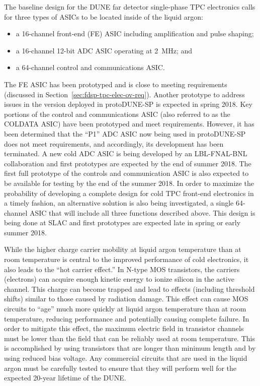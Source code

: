 The baseline design for the DUNE far detector single-phase TPC electronics calls for three types of ASICs to be located inside of the liquid argon:
\begin{itemize}
\item{a 16-channel front-end (FE) ASIC including amplification and pulse shaping;}
\item{a 16-channel 12-bit ADC ASIC operating at 2~MHz; and}
\item{a 64-channel control and communications ASIC.}
\end{itemize}
The FE ASIC has been prototyped and is close to meeting requirements (discussed in Section~\ref{sec:fdsp-tpc-elec-ov-req}). Another prototype to address issues in the version deployed in protoDUNE-SP is expected in spring 2018. Key portions of the control and communications ASIC (also referred to as the COLDATA ASIC) have been prototyped and meet requirements.  However, it has been determined that the ``P1'' ADC ASIC now being used in protoDUNE-SP does not meet requirements, and accordingly, its development has been terminated.  A new cold ADC ASIC is being developed by an LBL-FNAL-BNL collaboration and first prototypes are expected by the end of summer 2018.  The first full prototype of the controls and communication ASIC is also expected to be available for testing by the end of the summer 2018.  In order to maximize the probability of developing a complete design for cold TPC front-end electronics in a timely fashion, an alternative solution is also being investigated, a single 64-channel ASIC that will include all three functions described above.  This design is being done at SLAC and first prototypes are expected late in spring or early summer 2018.

While the higher charge carrier mobility at liquid argon temperature than at room temperature is central to the improved performance of cold electronics, it also leads to the ``hot carrier effect.''  In N-type MOS transistors, the carriers (electrons) can acquire enough kinetic energy to ionize silicon in the active channel.  This charge can become trapped and lead to effects (including threshold shifts) similar to those caused by radiation damage.  This effect can cause MOS circuits to ``age'' much more quickly at liquid argon temperature than at room temperature, reducing performance and potentially causing complete failure.  In order to mitigate this effect, the maximum electric field in transistor channels must be lower than the field that can be reliably used at room temperature.  This is accomplished by using transistors that are longer than minimum length and by using reduced bias voltage.  Any commercial circuits that are used in the liquid argon must be carefully tested to ensure that they will perform well for the expected 20-year lifetime of the DUNE.

